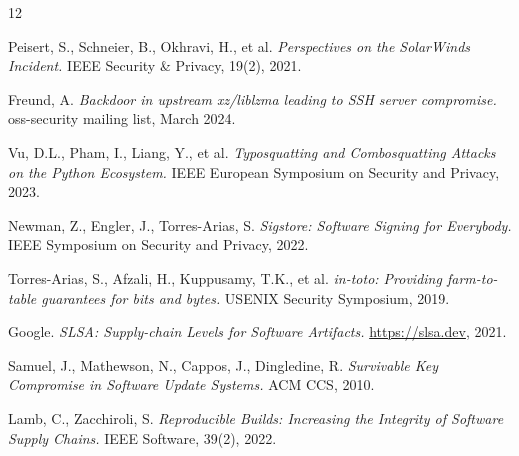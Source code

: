 \documentclass[11pt,a4paper]{article}
\begin{document}
\begin{thebibliography}{12}

Peisert, S., Schneier, B., Okhravi, H., et al.
\textit{Perspectives on the SolarWinds Incident.}
IEEE Security \& Privacy, 19(2), 2021.

Freund, A.
\textit{Backdoor in upstream xz/liblzma leading to SSH server compromise.}
oss-security mailing list, March 2024.

Vu, D.L., Pham, I., Liang, Y., et al.
\textit{Typosquatting and Combosquatting Attacks on the Python Ecosystem.}
IEEE European Symposium on Security and Privacy, 2023.

Newman, Z., Engler, J., Torres-Arias, S.
\textit{Sigstore: Software Signing for Everybody.}
IEEE Symposium on Security and Privacy, 2022.

Torres-Arias, S., Afzali, H., Kuppusamy, T.K., et al.
\textit{in-toto: Providing farm-to-table guarantees for bits and bytes.}
USENIX Security Symposium, 2019.

Google.
\textit{SLSA: Supply-chain Levels for Software Artifacts.}
\url{https://slsa.dev}, 2021.

Samuel, J., Mathewson, N., Cappos, J., Dingledine, R.
\textit{Survivable Key Compromise in Software Update Systems.}
ACM CCS, 2010.

Lamb, C., Zacchiroli, S.
\textit{Reproducible Builds: Increasing the Integrity of Software Supply Chains.}
IEEE Software, 39(2), 2022.


\end{thebibliography}
\end{document}
